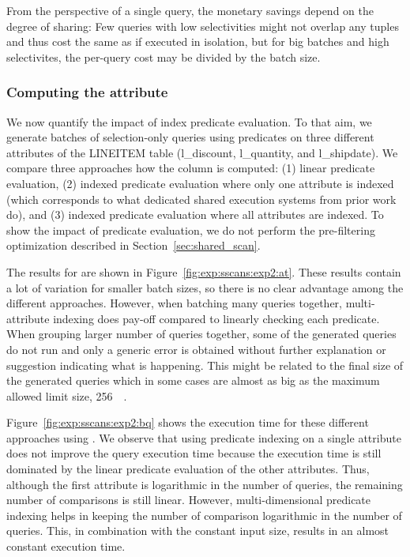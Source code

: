 From the perspective of a single query,
the monetary savings depend on the degree of sharing:
Few queries with low selectivities might not overlap any tuples
and thus cost the same as if executed in isolation,
but for big batches and high selectivites,
the per-query cost may be divided by the batch size.


\subsubsection{Computing the \qset attribute}
\label{sec:exp:sscan:pred_idx}

We now quantify the impact of index predicate evaluation.
To that aim, we generate batches of selection-only queries
using predicates on three different attributes of the LINEITEM table
(l\_discount, l\_quantity, and l\_shipdate).
We compare three approaches how the \qset column is computed:
(1) linear predicate evaluation,
(2) indexed predicate evaluation where only one attribute is indexed
(which corresponds to what dedicated shared execution systems
from prior work~\cite{Unterbrunner:2009:PPU:1687627.1687707} do),
and (3) indexed predicate evaluation where all attributes are indexed.
To show the impact of predicate evaluation,
we do not perform the pre-filtering optimization
described in Section~\ref{sec:shared_scan}.

The results for \athena  are shown in Figure~\ref{fig:exp:sscans:exp2:at}. These
results contain a lot of variation for smaller batch sizes, so there is no
clear advantage among the different approaches. However, when batching many
queries together, multi-attribute indexing does pay-off compared
to linearly checking each predicate. When grouping larger number of queries
together, some of the generated queries do
not run and only a generic error is obtained without further explanation or
suggestion indicating what is happening. This might be related to the final size of the
generated \sql queries which in some cases are almost as big as the maximum
allowed limit size, \SI{256}{\kibi\byte}.

Figure~\ref{fig:exp:sscans:exp2:bq} shows the execution time for these different
approaches using \bigquery. We observe that using predicate indexing on a single
attribute does not improve the query execution time because the execution
time is still dominated by the linear predicate evaluation of the other
attributes. Thus, although the first attribute is logarithmic in the number of
queries, the remaining number of comparisons is still linear.  However,
multi-dimensional predicate indexing helps in keeping the number of comparison
logarithmic in the number of queries. This, in combination with the constant
input size, results in an almost constant execution time. 

